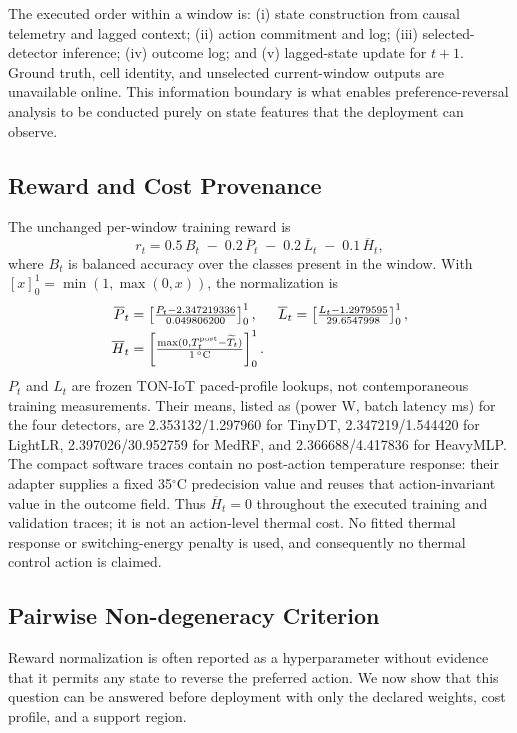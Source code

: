 The executed order within a window is: (i) state construction from causal telemetry and lagged context; (ii) action commitment and log; (iii) selected-detector inference; (iv) outcome log; and (v) lagged-state update for $t+1$. Ground truth, cell identity, and unselected current-window outputs are unavailable online. This information boundary is what enables preference-reversal analysis to be conducted purely on state features that the deployment can observe.

\subsection{Reward and Cost Provenance}
The unchanged per-window training reward is
\begin{equation}\label{eq:reward}
    r_t = 0.5\,B_t \;-\; 0.2\,\overline P_t \;-\; 0.2\,\overline L_t \;-\; 0.1\,\overline H_t,
\end{equation}
where $B_t$ is balanced accuracy over the classes present in the window. With $[x]_0^1=\min(1,\max(0,x))$, the normalization is
\begin{align}
    \overline P_t &= \left[\tfrac{P_t-2.347219336}{0.049806200}\right]_0^1, & \overline L_t &= \left[\tfrac{L_t-1.2979595}{29.6547998}\right]_0^1,\\
    \overline H_t &= \left[\tfrac{\max(0,T_t^{\rm post}-\widetilde T_t)}{1\,^{\circ}\mathrm{C}}\right]_0^1.
\end{align}
$P_t$ and $L_t$ are frozen TON-IoT paced-profile lookups, not contemporaneous training measurements. Their means, listed as (power W, batch latency ms) for the four detectors, are 2.353132/1.297960 for TinyDT, 2.347219/1.544420 for LightLR, 2.397026/30.952759 for MedRF, and 2.366688/4.417836 for HeavyMLP. The compact software traces contain no post-action temperature response: their adapter supplies a fixed 35$^{\circ}$C predecision value and reuses that action-invariant value in the outcome field. Thus $\overline H_t=0$ throughout the executed training and validation traces; it is not an action-level thermal cost. No fitted thermal response or switching-energy penalty is used, and consequently no thermal control action is claimed.

\subsection{Pairwise Non-degeneracy Criterion}
Reward normalization is often reported as a hyperparameter without evidence that it permits any state to reverse the preferred action. We now show that this question can be answered before deployment with only the declared weights, cost profile, and a support region.

